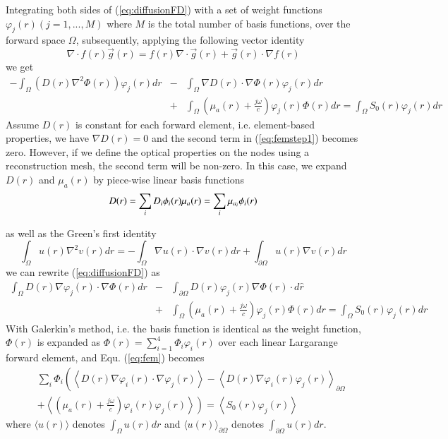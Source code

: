 \documentclass[12pt]{book}               %
\begin{document}
Integrating both sides of (\ref{eq:diffusionFD}) with a set of weight functions $\varphi_j(r) (j=1,...,M)$
where $M$ is the total number of basis functions, over the forward space $\Omega$, subsequently, applying the following vector
identity
\begin{equation}
\label{eq:veciden}\nabla\cdot f(r)\vec{g}(r)=f(r)\nabla\cdot
\vec{g}(r)+\vec{g}(r)\cdot\nabla f(r)
\end{equation}
we get
\begin{eqnarray}
\label{eq:femstep1}
-\int_{\Omega}{(D(r)\nabla^2\Phi(r))\varphi_j(r)dr}&-&\int_{\Omega}{\nabla D(r)\cdot\nabla\Phi(r)
\varphi_j(r)dr}\\\nonumber &+&\int_{\Omega}
{\left(\mu_a(r)+\frac{j\omega}{c}\right)\varphi_j(r)\Phi(r)dr}=\int_{\Omega}
{S_0(r)\varphi_j(r)dr}
\end{eqnarray}
Assume $D(r)$ is constant for each forward element, i.e. element-based properties, 
we have $\nabla D(r)=0$ and the second term in (\ref{eq:femstep1}) becomes zero. 
However, if we define the optical properties on the nodes using a reconstruction mesh,
the second term will be non-zero. In this case, we expand $D(r)$ and $\mu_{a}(r)$ by
piece-wise linear basis functions
\begin{equation}
\label{eq:parammesh}D(r)=\sum_{i}D_i\phi_i(r) \\
\mu_{a}(r)=\sum_{i}\mu_{a_i}\phi_i(r)
\end{equation}

as well as the Green's first identity
\begin{equation}
\label{eq:Green1} \int_{\Omega}{u(r)\nabla^2
v(r)dr}=-\int_{\Omega}{\nabla u(r)\cdot\nabla
v(r)dr}+\int_{\partial\Omega} {u(r)\nabla v(r)dr}
\end{equation}
we can rewrite (\ref{eq:diffusionFD}) as
\begin{eqnarray}
\label{eq:fem}
\int_{\Omega}{D(r)\nabla\varphi_j(r)\cdot\nabla\Phi(r)dr}&-&\int_{\partial\Omega}{D(r)\varphi_j(r)\nabla\Phi(r)\cdot
d\hat{r}}\\\nonumber &+&\int_{\Omega}
{\left(\mu_a(r)+\frac{j\omega}{c}\right)\varphi_j(r)\Phi(r)dr}=\int_{\Omega}
{S_0(r)\varphi_j(r)dr}
\end{eqnarray}
With Galerkin's method, i.e. the basis function is identical as
the weight function, $\Phi(r)$ is expanded as
$\Phi(r)=\sum_{i=1}^{4}\Phi_i\varphi_i(r)$ over each linear
Largarange forward element, and Equ. (\ref{eq:fem}) becomes
\begin{eqnarray}
\label{eq:galerkin}\nonumber&&\sum_{i}\Phi_i\left(\left\langle
D(r)\nabla\varphi_i(r)\cdot\nabla\varphi_j(r)\right\rangle -
\left\langle
D(r)\nabla\varphi_i(r)\varphi_j(r)\right\rangle_{\partial\Omega}\right.
\\&&+ \left.\left\langle
\left(\mu_a(r)+
\frac{j\omega}{c}\right)\varphi_i(r)\varphi_j(r)\right\rangle\right)=\left\langle
S_0(r)\varphi_j(r)\right\rangle
\end{eqnarray}
where $\langle u(r)\rangle$ denotes $\int_{\Omega}u(r)dr$ and
$\langle u(r)\rangle_{\partial\Omega}$ denotes
$\int_{\partial\Omega}u(r) dr$.
\end{document}
